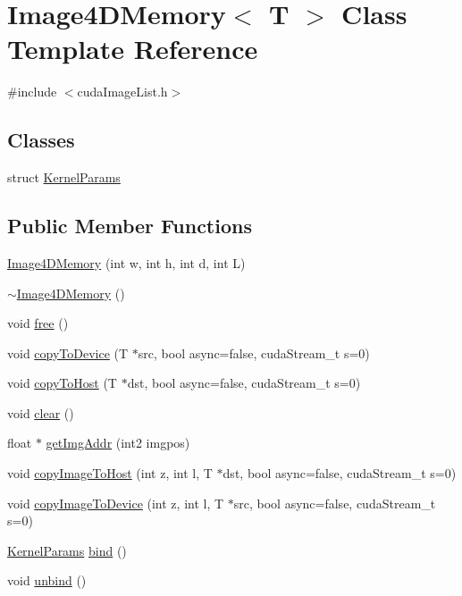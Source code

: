 \hypertarget{class_image4_d_memory}{}\section{Image4\+D\+Memory$<$ T $>$ Class Template Reference}
\label{class_image4_d_memory}


{\ttfamily \#include $<$cuda\+Image\+List.\+h$>$}

\subsection*{Classes}
\begin{DoxyCompactItemize}
\item 
struct \hyperlink{struct_image4_d_memory_1_1_kernel_params}{Kernel\+Params}
\end{DoxyCompactItemize}
\subsection*{Public Member Functions}
\begin{DoxyCompactItemize}
\item 
\hyperlink{class_image4_d_memory_ab0301a129aff5a180d2259bb0b8f265e}{Image4\+D\+Memory} (int w, int h, int d, int L)
\item 
\hyperlink{class_image4_d_memory_a793aec57044547a4eafced7d89119a4f}{$\sim$\+Image4\+D\+Memory} ()
\item 
void \hyperlink{class_image4_d_memory_a187b8613c6116ff7a3e2d16f89ea5a70}{free} ()
\item 
void \hyperlink{class_image4_d_memory_aa37bf1f44a1faa13a4e5bcaccbc3521d}{copy\+To\+Device} (T $\ast$src, bool async=false, cuda\+Stream\+\_\+t s=0)
\item 
void \hyperlink{class_image4_d_memory_a0d84c49ba07f61d125c78adb26e969d1}{copy\+To\+Host} (T $\ast$dst, bool async=false, cuda\+Stream\+\_\+t s=0)
\item 
void \hyperlink{class_image4_d_memory_ace4b1acc4a3cd9f4dd561adaf880e873}{clear} ()
\item 
float $\ast$ \hyperlink{class_image4_d_memory_abdb58f2c2a28a0e0bea8cac82701a481}{get\+Img\+Addr} (int2 imgpos)
\item 
void \hyperlink{class_image4_d_memory_af07453fab9eeb09835465c2b21134d78}{copy\+Image\+To\+Host} (int z, int l, T $\ast$dst, bool async=false, cuda\+Stream\+\_\+t s=0)
\item 
void \hyperlink{class_image4_d_memory_a55f9299c0d53c8972c66027421ecf181}{copy\+Image\+To\+Device} (int z, int l, T $\ast$src, bool async=false, cuda\+Stream\+\_\+t s=0)
\item 
\hyperlink{struct_image4_d_memory_1_1_kernel_params}{Kernel\+Params} \hyperlink{class_image4_d_memory_aa1e1911fc1cd6ad5bef770647b9111e7}{bind} ()
\item 
void \hyperlink{class_image4_d_memory_a05e6ae04355d403d82fd29e92ad1ff3c}{unbind} ()
\end{DoxyCompactItemize}
